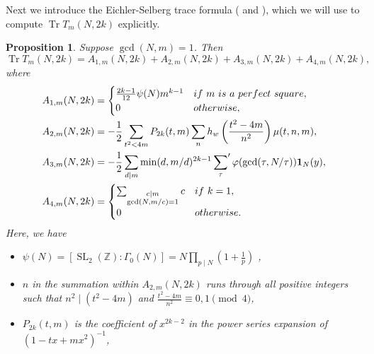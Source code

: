 \documentclass[11pt,letterpaper,reqno]{amsart}
\numberwithin{figure}{section}
\numberwithin{table}{section}
\theoremstyle{definition}
\theoremstyle{plain}
\newtheorem{proposition}[theorem]{Proposition}
\theoremstyle{definition}
\theoremstyle{definition}
\theoremstyle{remark}
\numberwithin{equation}{section}
\DeclareMathOperator{\SL}{SL}
\DeclareMathOperator{\Tr}{Tr}
\begin{document}
Next we introduce the Eichler-Selberg trace formula (\cite[p.~370-371]{knightly2006traces} and \cite[(34)]{serrehecke}), which we will use to compute $\Tr T_m(N,2k)$ explicitly. 

\begin{proposition}\label{eq:eich-selb}
Suppose $\gcd(N,m)=1$. Then
$$\Tr T_m(N, 2k) = A_{1,m}(N, 2k) + A_{2,m}(N, 2k) + A_{3,m}(N, 2k) + A_{4,m}(N, 2k),$$
where
\begin{align}
    A_{1,m}(N, 2k)&=\begin{cases}
        \frac{2k-1}{12}\psi(N)m^{k-1} & {\rm if } ~m~ {\rm is~a~perfect~square},\\
        0 & {\rm otherwise},\\
    \end{cases}\\
    A_{2,m}(N, 2k)&=-\frac{1}{2}\sum_{t^2<4m}P_{2k}(t,m)\sum_n h_w\left(\frac{t^2-4m}{n^2}\right)\mu(t,n,m),\\
    A_{3,m}(N, 2k)&=-\frac{1}{2}\sum_{d \mid m}\min(d,m/d)^{2k-1}\sump_{\tau}\varphi(\gcd(\tau,N/\tau))\mathbf{1}_N(y),\\
    A_{4,m}(N, 2k)&=\begin{cases}
        \sum_{\substack{c|m\\
    \gcd(N,m/c)=1}}c& {\rm if }~k=1,\\
    0 & {\rm otherwise}.
    \end{cases}
\end{align}
Here, we have
\begin{itemize}
    \item $\psi(N)= [\SL_2(\mathbb{Z}):\Gamma_0(N)]= N\prod_{p \mid N} \left(1 + \frac{1}{p}\right)$ \cite[p.~21]{diamond2005first},
    \item $n$ in the summation within $A_{2,m}(N, 2k)$ runs through all positive integers such that $n^2 \mid (t^2-4m)$ and $\frac{t^2-4m}{n^2}\equiv0,1\pmod 4$,
    \item $P_{2k}(t,m)$ is the coefficient of $x^{2k-2}$ in the power series expansion of $(1 - tx + mx^2)^{-1}$,

\end{itemize}
\end{proposition}
\end{document}
